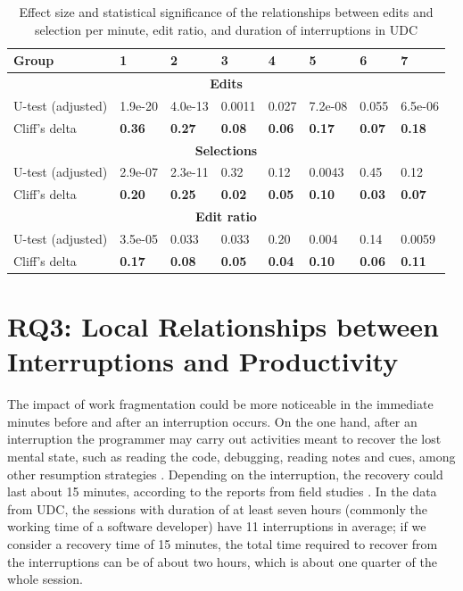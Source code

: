 \documentclass[times]{smrauth}
\begin{document}
\begin{table}[ht!]
	\tiny
	\renewcommand{\arraystretch}{1.3}
	\caption{Effect size and statistical significance of the relationships between edits and selection per minute, edit ratio, and duration of interruptions in UDC} %
	\label{tbl:effect_size_dur_udc}
	\centering
	\begin{tabular}{l | p{1cm} | p{1cm} | p{1cm} | p{1cm} | p{1cm} | p{1cm} | p{1cm}} 
		Group & 1 & 2 & 3 & 4 & 5 & 6 & 7  \\  
		\hline
		\multicolumn{8}{c}{\textbf{Edits}} \\
		\hline
		U-test (adjusted) & 1.9e-20 & 4.0e-13 & 0.0011 & 0.027 & 7.2e-08 & 0.055 & 6.5e-06\\
		\hline
		Cliff's delta & \textbf{0.36} & \textbf{0.27} & \textbf{0.08} & \textbf{0.06} & \textbf{0.17} & \textbf{0.07} & \textbf{0.18} \\
		\hline
		
		\multicolumn{8}{c}{\textbf{Selections}} \\
		\hline 
		U-test (adjusted) & 2.9e-07 & 2.3e-11 & 0.32 & 0.12 & 0.0043 & 0.45 & 0.12 \\
		\hline
		Cliff's delta & \textbf{0.20} & \textbf{0.25} & \textbf{0.02} & \textbf{0.05} & \textbf{0.10} & \textbf{0.03} & \textbf{0.07} \\  
		\hline
		
		\multicolumn{8}{c}{\textbf{Edit ratio}} \\
		\hline 
		U-test (adjusted) & 3.5e-05 & 0.033 & 0.033 & 0.20 & 0.004 & 0.14 & 0.0059 \\
		\hline 
		Cliff's delta & \textbf{0.17} & \textbf{0.08} & \textbf{0.05} & \textbf{0.04} & \textbf{0.10} & \textbf{0.06} & \textbf{0.11}  \\
		\hline
		
	\end{tabular}
\end{table}


\section{RQ3: Local Relationships between Interruptions and Productivity}

The impact of work fragmentation could be more noticeable in the immediate minutes before and after an interruption occurs. On the one hand, after an interruption the programmer may carry out activities meant to recover the lost mental state, such as reading the code, debugging, reading notes and cues, among other resumption strategies \cite{PR11}. Depending on the interruption, the recovery could last about 15 minutes, according to the reports from field studies \cite{IH07, SBV98}. In the data from UDC, the sessions with duration of at least seven hours (commonly the working time of a software developer) have 11 interruptions in average; if we consider a recovery time of 15 minutes, the total time required to recover from the interruptions can be of about two hours, which is about one quarter of the whole session.
\end{document}
